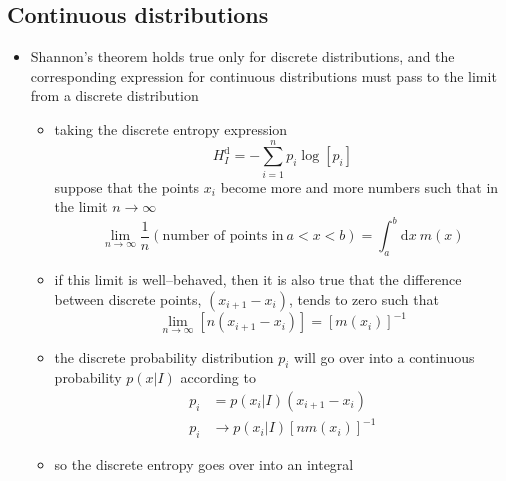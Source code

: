 \documentclass[../jaynes_prob_theory_notes.tex]{subfiles}
\begin{document}
        \subsection{Continuous distributions}
            \begin{itemize} 
                \item Shannon's theorem holds true only for discrete distributions, and the  corresponding expression for continuous distributions must pass to the limit from a discrete distribution
                    \begin{itemize} 
                        \item taking the discrete entropy expression
                            \begin{equation*} 
                                H^{\text{d}}_{I} = - \sum\limits^{n}_{i=1} p_i \log [p_i]
                            \end{equation*}
                            suppose that the points \( x_i \) become more and more numbers such that in the limit \( n \rightarrow \infty \)
                            \begin{equation*} 
                                \lim_{n \rightarrow \infty} \frac{1}{n} (\text{number of points in}~a < x < b) = \int^{b}_{a} \mathrm{d}x~m(x)
                            \end{equation*}
                        \item if this limit is well--behaved, then it is also true that the difference between discrete points, \( (x_{i+1} - x_i) \), tends to zero such that
                            \begin{equation*} 
                                \lim_{n \rightarrow \infty} [n(x_{i+1} - x_i)] = {[m(x_i)]}^{-1}
                            \end{equation*}
                        \item the discrete probability distribution \( p_i \) will go over into a continuous probability \( p(x|I) \) according to
                            \begin{align*} 
                                p_i &= p(x_i|I)(x_{i+1} - x_i) \\
                                p_i &\rightarrow p(x_i | I){[nm(x_i)]}^{-1}
                            \end{align*}
                        \item so the discrete entropy goes over into an integral
                            \begin{equation*} 

\end{equation*}
\end{itemize}
\end{itemize}
\end{document}

